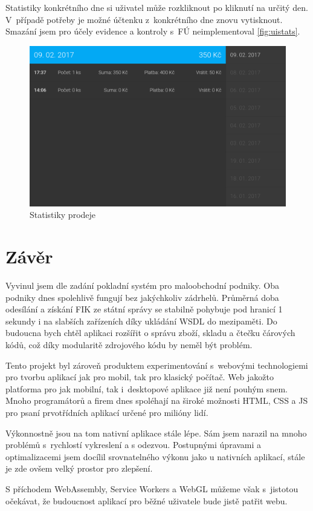 \documentclass[a4paper,11pt,oneside]{article}
\begin{document}
Statistiky konkrétního dne si uživatel může rozkliknout po kliknutí na určitý den. V~případě potřeby je možné účtenku z~konkrétního dne znovu vytisknout. Smazání jsem pro účely evidence a kontroly s~FÚ neimplementoval \eqref{fig:uistats}.

\begin{figure}[H]
	\centering
	\includegraphics[width=0.7\linewidth]{../ui_stats}
	\caption{Statistiky prodeje}
	\label{fig:uistats}
\end{figure}

\pagebreak
\section{Závěr}
Vyvinul jsem dle zadání pokladní systém pro maloobchodní podniky. Oba podniky dnes spolehlivě fungují bez jakýchkoliv zádrhelů. Průměrná doba odesílání a získání FIK ze státní správy se stabilně pohybuje pod hranicí 1 sekundy i na slabších zařízeních díky ukládání WSDL do mezipaměti. Do budoucna bych chtěl aplikaci rozšířit o správu zboží, skladu a čtečku čárových kódů, což díky modularitě zdrojového kódu by neměl být problém.

Tento projekt byl zároveň produktem experimentování s~webovými technologiemi pro tvorbu aplikací jak pro mobil, tak pro klasický počítač. Web jakožto platforma pro jak mobilní, tak i~desktopové aplikace již není pouhým snem. Mnoho programátorů a firem dnes spoléhají na široké možnosti HTML, CSS a JS pro psaní prvotřídních aplikací určené pro milióny lidí. 

Výkonnostně jsou na tom nativní aplikace stále lépe. Sám jsem narazil na mnoho problémů s~rychlostí vykreslení a s odezvou. Postupnými úpravami a optimalizacemi jsem docílil srovnatelného výkonu jako u nativních aplikací, stále je zde ovšem velký prostor pro zlepšení. 

S příchodem WebAssembly, Service Workers a WebGL můžeme však s~jistotou očekávat, že budoucnost aplikací pro běžné uživatele bude jistě patřit webu. 
\end{document}
